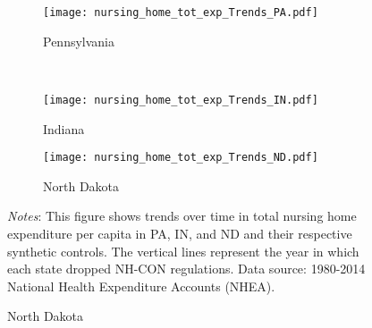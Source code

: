 \documentclass[../Main.tex]{subfiles}
\begin{document}
\newpage
\begin{figure}[t]
	\begin{center}
	\caption{\label{fig:tot_exp_trends} \centering Trends in Total Nursing Home Expenditure Per Capita}
    \begin{subfigure}[b]{\textwidth} \centering
    \caption{Pennsylvania}\texttt{[image: nursing\_home\_tot\_exp\_Trends\_PA.pdf]}
    \end{subfigure}\\
    \vspace{.4cm}
    \begin{subfigure}[b]{.48\textwidth} \centering
    \caption{Indiana}\texttt{[image: nursing\_home\_tot\_exp\_Trends\_IN.pdf]}
    \end{subfigure}\quad%
    \begin{subfigure}[b]{.48\textwidth} \centering
    \caption{North Dakota}\texttt{[image: nursing\_home\_tot\_exp\_Trends\_ND.pdf]}
    \end{subfigure}
    \end{center}
    \footnotesize
		\textit{Notes}: This figure shows trends over time in total nursing home expenditure per capita in PA, IN, and ND and their respective synthetic controls. The vertical lines represent the year in which each state dropped NH-CON regulations. Data source: 1980-2014 National Health Expenditure Accounts (NHEA).
\end{figure}
\clearpage
\end{document}

